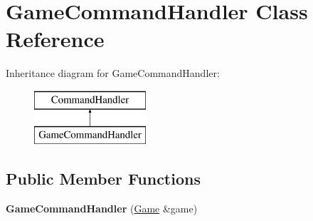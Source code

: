\hypertarget{class_game_command_handler}{\section{Game\-Command\-Handler Class Reference}
\label{class_game_command_handler}
}
Inheritance diagram for Game\-Command\-Handler\-:\begin{figure}[H]
\begin{center}
\leavevmode
\includegraphics[height=2.000000cm]{class_game_command_handler}
\end{center}
\end{figure}
\subsection*{Public Member Functions}
\begin{DoxyCompactItemize}
\item 
\hypertarget{class_game_command_handler_a64214d5446cb173055d552a83c9c54bb}{{\bfseries Game\-Command\-Handler} (\hyperlink{class_game}{Game} \&game)}\label{class_game_command_handler_a64214d5446cb173055d552a83c9c54bb}

\end{DoxyCompactItemize}
